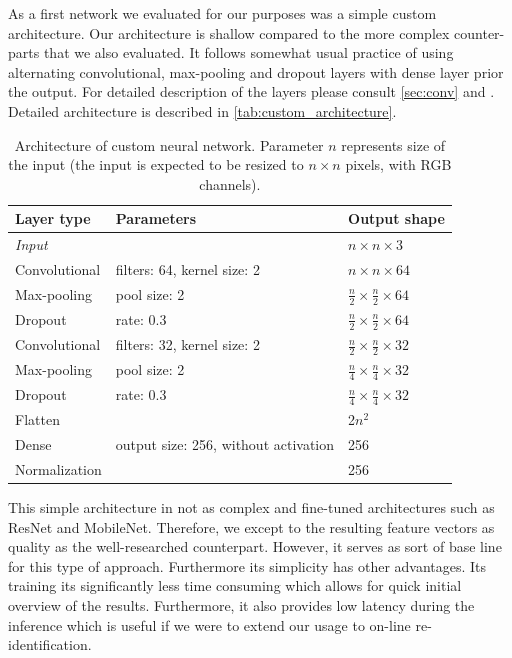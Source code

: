 As a first network we evaluated for our purposes was a simple custom
architecture. Our architecture is shallow compared to the more complex
counter-parts that we also evaluated. It follows somewhat usual practice
of using alternating convolutional, max-pooling and dropout layers with
dense layer prior the output. For detailed description of the layers please
consult \autoref{sec:conv} and \cite{deeplearningbook}. Detailed architecture
is described in \autoref{tab:custom_architecture}.

\begin{table}
    \centering
    \begin{tabular}{l|l|l}
         Layer type & Parameters & Output shape \\ \hline
         \emph{Input} & & $n \times n \times 3$ \\
         Convolutional & filters: 64, kernel size: 2 & $n \times n \times 64$ \\
         Max-pooling & pool size: 2 & $\frac{n}{2} \times \frac{n}{2} \times 64$ \\
         Dropout & rate: 0.3 & $\frac{n}{2} \times \frac{n}{2} \times 64$ \\
         Convolutional & filters: 32, kernel size: 2 & $\frac{n}{2} \times \frac{n}{2} \times 32$ \\
         Max-pooling & pool size: 2 & $\frac{n}{4} \times \frac{n}{4} \times 32$ \\
         Dropout & rate: 0.3 & $\frac{n}{4} \times \frac{n}{4} \times 32$ \\
         Flatten & & 2$n^2$ \\
         Dense & output size: 256, without activation & 256 \\
         Normalization & & 256
    \end{tabular}
    \caption[Architecture of custom neural network]{Architecture of custom neural network. Parameter $n$ represents size of the input (the input is expected to be resized to $n\times n$ pixels, with RGB channels).}
    \label{tab:custom_architecture}
\end{table}

This simple architecture in not as complex and fine-tuned architectures
such as ResNet and MobileNet. Therefore, we except to the resulting
feature vectors as quality as the well-researched counterpart. However,
it serves as sort of base line for this type of approach. Furthermore its
simplicity has other advantages. Its training its significantly less time
consuming which allows for quick initial overview of the results. Furthermore,
it also provides low latency during the inference which is useful if we were
to extend our usage to on-line re-identification.

